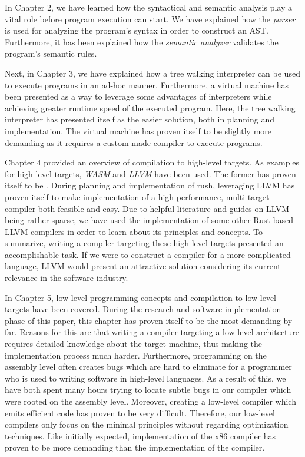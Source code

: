 In Chapter 2, we have learned how the syntactical and semantic analysis play a vital role before program execution can start.
We have explained how the \emph{parser} is used for analyzing the program's syntax in order to construct an AST.
Furthermore, it has been explained how the \emph{semantic analyzer} validates the program's semantic rules.

Next, in Chapter 3, we have explained how a tree walking interpreter can be used to execute programs in an ad-hoc manner.
Furthermore, a virtual machine has been presented as a way to leverage some advantages of interpreters while
achieving greater runtime speed of the executed program.
Here, the tree walking interpreter has presented itself as the easier solution, both in planning and implementation.
The virtual machine has proven itself to be slightly more demanding as it requires a custom-made compiler to execute programs.

Chapter 4 provided an overview of compilation to high-level targets.
As examples for high-level targets, \emph{WASM} and \emph{LLVM} have been used.
The former has proven itself to be .
During planning and implementation of rush, leveraging LLVM has proven itself to make implementation of a high-performance, multi-target compiler both feasible and easy.
Due to helpful literature and guides on LLVM being rather sparse, we have used the implementation of some other Rust-based LLVM compilers
in order to learn about its principles and concepts.
To summarize, writing a compiler targeting these high-level targets presented an accomplishable task.
If we were to construct a compiler for a more complicated language, LLVM would present an attractive solution considering its current relevance in the software industry.

In Chapter 5, low-level programming concepts and compilation to low-level targets have been covered.
During the research and software implementation phase of this paper,
this chapter has proven itself to be the most demanding by far.
Reasons for this are that writing a compiler targeting a low-level architecture
requires detailed knowledge about the target machine, thus making the implementation process much harder.
Furthermore, programming on the assembly level often creates bugs which are hard to eliminate for a programmer who is used to writing software in high-level languages.
As a result of this, we have both spent many hours trying to locate subtle bugs in our compiler which were rooted on the assembly level.
Moreover, creating a low-level compiler which emits efficient code has proven to be very difficult.
Therefore, our low-level compilers only focus on the minimal principles without regarding optimization techniques.
Like initially expected, implementation of the x86 compiler has proven to be more demanding than the implementation of the \riscv{} compiler.

